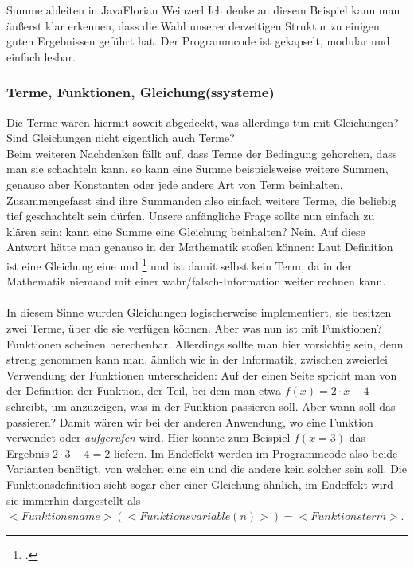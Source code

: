 				{Summe ableiten in Java}{Florian Weinzerl}
\noindent
Ich denke an diesem Beispiel kann man äußerst klar erkennen, dass die Wahl unserer derzeitigen Struktur zu einigen guten Ergebnissen geführt hat. Der Programmcode ist gekapselt, modular und einfach lesbar.

\subsubsection{Terme, Funktionen, Gleichung(ssysteme)}
Die Terme wären hiermit soweit abgedeckt, was allerdings tun mit Gleichungen? Sind Gleichungen nicht eigentlich auch Terme?\\
Beim weiteren Nachdenken fällt auf, dass Terme der Bedingung gehorchen, dass man sie schachteln kann, so kann eine Summe beispielsweise weitere Summen, genauso aber Konstanten oder jede andere Art von Term beinhalten. Zusammengefasst sind ihre Summanden also einfach weitere Terme, die beliebig tief geschachtelt sein dürfen. Unsere anfängliche Frage sollte nun einfach zu klären sein: kann eine Summe eine Gleichung beinhalten? Nein. Auf diese Antwort hätte man genauso in der Mathematik stoßen können: Laut Definition ist eine Gleichung eine  und \footcite{math_gleichung} und ist damit selbst kein Term, da in der Mathematik niemand mit einer wahr/falsch-Information weiter rechnen kann.\\
\\
In diesem Sinne wurden Gleichungen logischerweise implementiert, sie besitzen zwei Terme, über die sie verfügen können. Aber was nun ist mit Funktionen? Funktionen scheinen berechenbar. Allerdings sollte man hier vorsichtig sein, denn streng genommen kann man, ähnlich wie in der Informatik, zwischen zweierlei Verwendung der Funktionen unterscheiden: Auf der einen Seite spricht man von der Definition der Funktion, der Teil, bei dem man etwa $f(x) = 2 \cdot x  - 4$ schreibt, um anzuzeigen, was in der Funktion passieren soll. Aber wann soll das passieren? Damit wären wir bei der anderen Anwendung, wo eine Funktion verwendet oder \textit{aufgerufen} wird. Hier könnte zum Beispiel $f(x=3)$ das Ergebnis $2 \cdot 3 - 4 = 2$ liefern. Im Endeffekt werden im Programmcode also beide Varianten benötigt, von welchen eine ein  und die andere kein solcher sein soll. Die Funktionsdefinition sieht sogar eher einer Gleichung ähnlich, im Endeffekt wird sie immerhin dargestellt als $<Funktionsname>(<Funktionsvariable(n)>)=<Funktionsterm>$.\\
